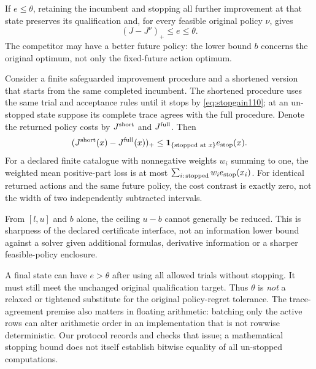 \begin{theorem}\label{thm:budget110}
If $e\le\theta$, retaining the incumbent and stopping all further improvement at that state preserves its qualification and, for every feasible original policy $\nu$, gives
\begin{equation}\label{eq:stopgain110}
 (J-J^\nu)_+\le e\le\theta.
\end{equation}
The competitor may have a better future policy: the lower bound $b$ concerns the original optimum, not only the fixed-future action optimum.

Consider a finite safeguarded improvement procedure and a shortened version that starts from the same completed incumbent. The shortened procedure uses the same trial and acceptance rules until it stops by \eqref{eq:stopgain110}; at an un-stopped state suppose its complete trace agrees with the full procedure. Denote the returned policy costs by $J^{\rm short}$ and $J^{\rm full}$. Then
\begin{equation}\label{eq:short110}
 (J^{\rm short}(x)-J^{\rm full}(x))_+
 \le\boldsymbol1_{\{\text{stopped at }x\}}e_{\rm stop}(x).
\end{equation}
For a declared finite catalogue with nonnegative weights $w_i$ summing to one, the weighted mean positive-part loss is at most
$\sum_{i:\,\mathrm{stopped}}w_i e_{\rm stop}(x_i)$.
For identical returned actions and the same future policy, the cost contrast is exactly zero, not the width of two independently subtracted intervals.

From $[l,u]$ and $b$ alone, the ceiling $u-b$ cannot generally be reduced. This is sharpness of the declared certificate interface, not an information lower bound against a solver given additional formulas, derivative information or a sharper feasible-policy enclosure.
\end{theorem}

A final state can have $e>\theta$ after using all allowed trials without stopping. It must still meet the unchanged original qualification target. Thus $\theta$ is \emph{not} a relaxed or tightened substitute for the original policy-regret tolerance. The trace-agreement premise also matters in floating arithmetic: batching only the active rows can alter arithmetic order in an implementation that is not rowwise deterministic. Our protocol records and checks that issue; a mathematical stopping bound does not itself establish bitwise equality of all un-stopped computations.

